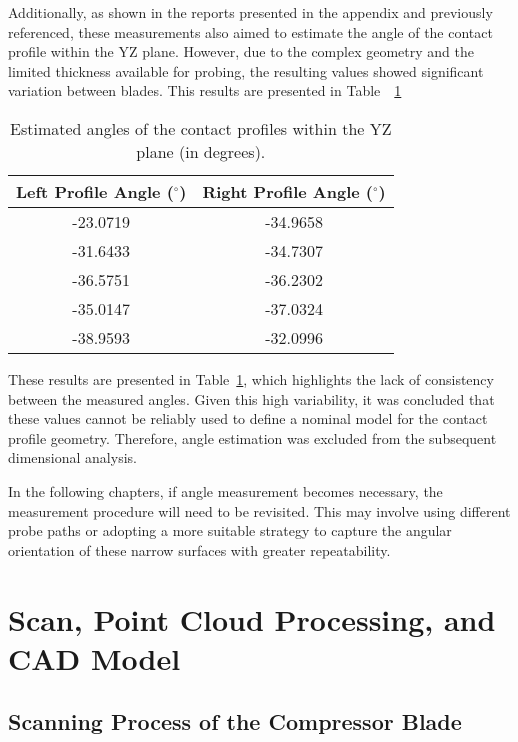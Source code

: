 Additionally, as shown in the reports presented in the appendix and previously referenced, these measurements also aimed to estimate the angle of the contact profile within the YZ plane. However, due to the complex geometry and the limited thickness available for probing, the resulting values showed significant variation between blades.
This results are presented in Table~~\ref{tab:angulos}

\begin{table}[H]
    \centering
    \caption{Estimated angles of the contact profiles within the YZ plane (in degrees).}
    \label{tab:angulos}
    \begin{tabular}{c|c}
        \hline
        \textbf{Left Profile Angle ($^{\circ}$)} & \textbf{Right Profile Angle ($^{\circ}$)} \\ \hline
        -23.0719 & -34.9658 \\
        -31.6433 & -34.7307 \\
        -36.5751 & -36.2302 \\
        -35.0147 & -37.0324 \\
        -38.9593 & -32.0996 \\ \hline
    \end{tabular}
\end{table}

These results are presented in Table~\ref{tab:angulos}, which highlights the lack of consistency between the measured angles. Given this high variability, it was concluded that these values cannot be reliably used to define a nominal model for the contact profile geometry. Therefore, angle estimation was excluded from the subsequent dimensional analysis.

In the following chapters, if angle measurement becomes necessary, the measurement procedure will need to be revisited. This may involve using different probe paths or adopting a more suitable strategy to capture the angular orientation of these narrow surfaces with greater repeatability.

\chapter{Scan, Point Cloud Processing, and CAD Model}
\label{cha:digi}


\section{Scanning Process of the Compressor Blade}
\label{sec:scan}

